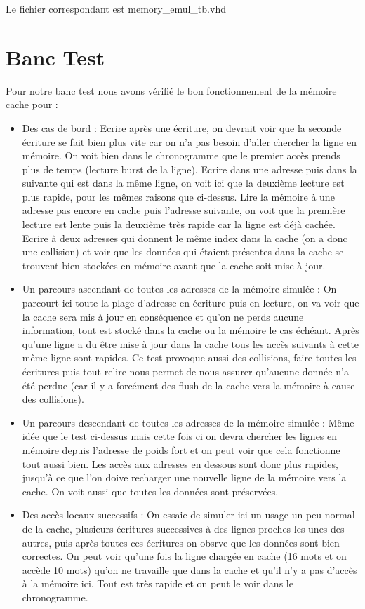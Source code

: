 \documentclass[10pt,a4paper]{article}
\begin{document}
Le fichier correspondant est memory\_emul\_tb.vhd 
\section{Banc Test}
Pour notre banc test nous avons vérifié le bon fonctionnement de la mémoire cache pour :
\begin{itemize}
\item Des cas de bord :
Ecrire après une écriture, on devrait voir que la seconde écriture se fait bien plus vite car on n'a pas besoin d'aller chercher la ligne en mémoire. On voit bien dans le chronogramme que le premier accès prends plus de temps (lecture burst de la ligne).
Ecrire dans une adresse puis dans la suivante qui est dans la même ligne, on voit ici que la deuxième lecture est plus rapide, pour les mêmes raisons que ci-dessus.
Lire la mémoire à une adresse pas encore en cache puis l'adresse suivante, on voit que la première lecture est lente puis la deuxième très rapide car la ligne est déjà cachée.
Ecrire à deux adresses qui donnent le même index dans la cache (on a donc une collision) et voir que les données qui étaient présentes dans la cache se trouvent bien stockées en mémoire avant que la cache soit mise à jour.
\item Un parcours ascendant de toutes les adresses de la mémoire simulée :
On parcourt ici toute la plage d'adresse en écriture puis en lecture, on va voir que la cache sera mis à jour en conséquence et qu'on ne perds aucune information, tout est stocké dans la cache ou la mémoire le cas échéant. Après qu'une ligne a du être mise à jour dans la cache tous les accès suivants à cette même ligne sont rapides. Ce test provoque aussi des collisions, faire toutes les écritures puis tout relire nous permet de nous assurer qu'aucune donnée n'a été perdue (car il y a forcément des flush de la cache vers la mémoire à cause des collisions).
\item Un parcours descendant de toutes les adresses de la mémoire simulée :
Même idée que le test ci-dessus mais cette fois ci on devra chercher les lignes en mémoire depuis l'adresse de poids fort et on peut voir que cela fonctionne tout aussi bien. Les accès aux adresses en dessous sont donc plus rapides, jusqu'à ce que l'on doive recharger une nouvelle ligne de la mémoire vers la cache. On voit aussi que toutes les données sont préservées.
\item Des accès locaux successifs :
On essaie de simuler ici un usage un peu normal de la cache, plusieurs écritures successives à des lignes proches les unes des autres, puis après toutes ces écritures on obsrve que les données sont bien correctes. On peut voir qu'une fois la ligne chargée en cache (16 mots et on accède 10 mots) qu'on ne travaille que dans la cache et qu'il n'y a pas d'accès à la mémoire ici. Tout est très rapide et on peut le voir dans le chronogramme.
\end{itemize}
\end{document}
